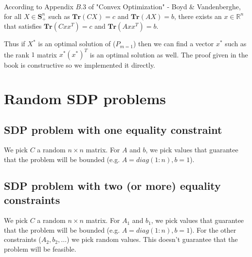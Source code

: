 \documentclass{article}
\begin{document}
According to Appendix $B.3$ of "Convex Optimization" - Boyd \& Vandenberghe, for all $X \in \mathbf{S}^n_+$ such as $\mathbf{Tr}(C X) = c$ and $\mathbf{Tr}(A X) = b$, there exists an $x \in \mathbb{R}^n$ that satisfies $\mathbf{Tr}(C x x^T) = c$ and $\mathbf{Tr}(A x x^T) = b$. 

Thus if $X^*$ is an optimal solution of ($P_{m = 1}$) then we can find a vector $x^*$ such as the rank $1$ matrix $x^* (x^*)^T$ is an optimal solution as well. The proof given in the book is constructive so we implemented it directly.

\section{Random SDP problems}

\subsection{SDP problem with one equality constraint}
We pick $C$ a random $n \times n$ matrix. For $A$ and $b$, we pick values that guarantee that the problem will be bounded (e.g. $A = diag(1 : n), b = 1$).

\subsection{SDP problem with two (or more) equality constraints}
We pick $C$ a random $n \times n$ matrix. For $A_1$ and $b_1$, we pick values that guarantee that the problem will be bounded (e.g. $A = diag(1 : n), b = 1$). For the other constraints ($A_2, b_2, \dots$) we pick random values. This doesn't guarantee that the problem will be feasible.
\end{document}
